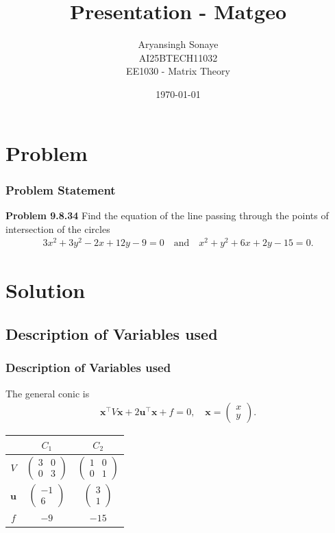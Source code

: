 \documentclass{beamer}
\title{Presentation - Matgeo}
\author{Aryansingh Sonaye \\
AI25BTECH11032 \\
EE1030 - Matrix Theory}
\date{\today}
\theoremstyle{remark}
\newcommand{\myvec}[1]{\ensuremath{\begin{pmatrix}#1\end{pmatrix}}}
\let\vec\mathbf
\numberwithin{equation}{section}
\begin{document}
\begin{frame}
\titlepage
\end{frame}

\section{Problem}
\begin{frame}
\frametitle{Problem Statement}
\textbf{Problem 9.8.34}
Find the equation of the line passing through the points of intersection of the circles
\begin{align}
3x^2+3y^2-2x+12y-9=0
\quad\text{and}\quad
x^2+y^2+6x+2y-15=0.
\end{align}


\end{frame}

\section{Solution}
\subsection{Description of Variables used}
\begin{frame}
\frametitle{Description of Variables used}
The general conic is
\begin{align}
\vec{x}^\top V \vec{x} + 2\vec{u}^\top \vec{x} + f = 0, 
\quad \vec{x}=\myvec{x\\y}.
\end{align}

\begin{table}[H]
\centering
\begin{tabular}{|c|c|c|}
\hline
 & $C_1$ & $C_2$ \\
\hline
$V$ & $\myvec{3 & 0 \\ 0 & 3}$ & $\myvec{1 & 0 \\ 0 & 1}$ \\
\hline
$\vec{u}$ & $\myvec{-1 \\ 6}$ & $\myvec{3 \\ 1}$ \\
\hline
$f$ & $-9$ & $-15$ \\
\hline
\end{tabular}
\end{table}


\end{frame}
\end{document}
